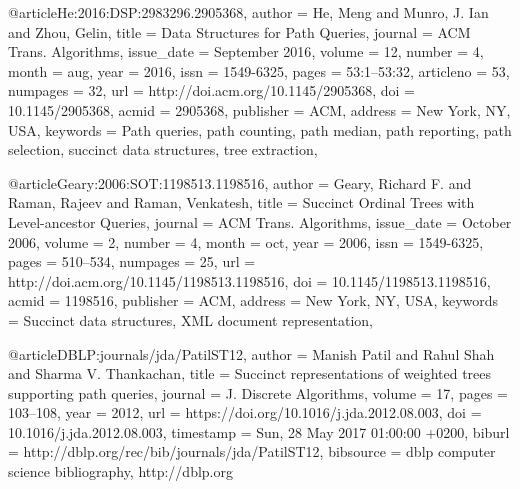 @article{He:2016:DSP:2983296.2905368,
 author = {He, Meng and Munro, J. Ian and Zhou, Gelin},
 title = {Data Structures for Path Queries},
 journal = {ACM Trans. Algorithms},
 issue_date = {September 2016},
 volume = {12},
 number = {4},
 month = aug,
 year = {2016},
 issn = {1549-6325},
 pages = {53:1--53:32},
 articleno = {53},
 numpages = {32},
 url = {http://doi.acm.org/10.1145/2905368},
 doi = {10.1145/2905368},
 acmid = {2905368},
 publisher = {ACM},
 address = {New York, NY, USA},
 keywords = {Path queries, path counting, path median, path reporting, path selection, succinct data structures, tree extraction},
} 

@article{Geary:2006:SOT:1198513.1198516,
 author = {Geary, Richard F. and Raman, Rajeev and Raman, Venkatesh},
 title = {Succinct Ordinal Trees with Level-ancestor Queries},
 journal = {ACM Trans. Algorithms},
 issue_date = {October 2006},
 volume = {2},
 number = {4},
 month = oct,
 year = {2006},
 issn = {1549-6325},
 pages = {510--534},
 numpages = {25},
 url = {http://doi.acm.org/10.1145/1198513.1198516},
 doi = {10.1145/1198513.1198516},
 acmid = {1198516},
 publisher = {ACM},
 address = {New York, NY, USA},
 keywords = {Succinct data structures, XML document representation},
} 

@article{DBLP:journals/jda/PatilST12,
  author    = {Manish Patil and
               Rahul Shah and
               Sharma V. Thankachan},
  title     = {Succinct representations of weighted trees supporting path queries},
  journal   = {J. Discrete Algorithms},
  volume    = {17},
  pages     = {103--108},
  year      = {2012},
  url       = {https://doi.org/10.1016/j.jda.2012.08.003},
  doi       = {10.1016/j.jda.2012.08.003},
  timestamp = {Sun, 28 May 2017 01:00:00 +0200},
  biburl    = {http://dblp.org/rec/bib/journals/jda/PatilST12},
  bibsource = {dblp computer science bibliography, http://dblp.org}
}

